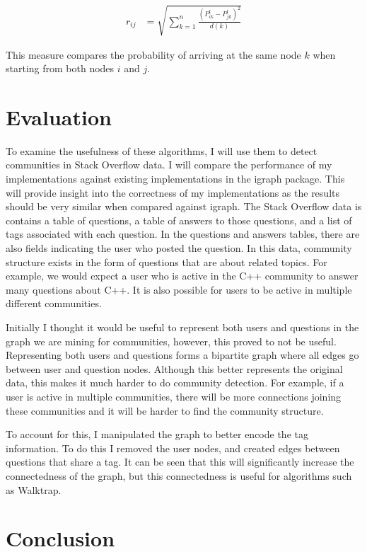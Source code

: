\documentclass{article}
\begin{document}
    \begin{align}
        r_{ij} &= \sqrt{\sum^n_{k=1}{\frac{(P^t_{ik} - P^t_{jk})^2}{d(k)}}}
    \end{align}

    This measure compares the probability of arriving at the same node $k$ when starting from both nodes $i$ and $j$.

\section{Evaluation}
To examine the usefulness of these algorithms, I will use them to detect communities in Stack Overflow data. I will compare the performance of my implementations against existing implementations in the igraph package. This will provide insight into the correctness of my implementations as the results should be very similar when compared against igraph. The Stack Overflow data is contains a table of questions, a table of answers to those questions, and a list of tags associated with each question. In the questions and answers tables, there are also fields indicating the user who posted the question. In this data, community structure exists in the form of questions that are about related topics. For example, we would expect a user who is active in the C++ community to answer many questions about C++. It is also possible for users to be active in multiple different communities.
\par
Initially I thought it would be useful to represent both users and questions in the graph we are mining for communities, however, this proved to not be useful. Representing both users and questions forms a bipartite graph where all edges go between user and question nodes. Although this better represents the original data, this makes it much harder to do community detection. For example, if a user is active in multiple communities, there will be more connections joining these communities and it will be harder to find the community structure.
\par
To account for this, I manipulated the graph to better encode the tag information. To do this I removed the user nodes, and created edges between questions that share a tag. It can be seen that this will significantly increase the connectedness of the graph, but this connectedness is useful for algorithms such as Walktrap.

\section{Conclusion}

\newpage


\end{document}
